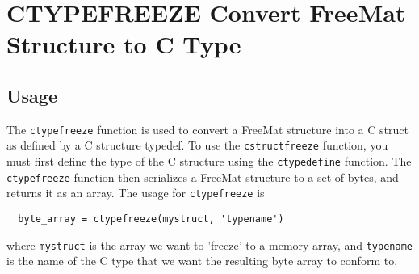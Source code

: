 \section{CTYPEFREEZE Convert FreeMat Structure to C Type}

\subsection{Usage}

The \verb|ctypefreeze| function is used to convert a FreeMat structure into
a C struct as defined by a C structure typedef.  To use the \verb|cstructfreeze|
function, you must first define the type of the C structure using the 
\verb|ctypedefine| function.  The \verb|ctypefreeze| function then serializes
a FreeMat structure to a set of bytes, and returns it as an array.  The
usage for \verb|ctypefreeze| is
\begin{verbatim}
  byte_array = ctypefreeze(mystruct, 'typename')
\end{verbatim}
where \verb|mystruct| is the array we want to 'freeze' to a memory array,
and \verb|typename| is the name of the C type that we want the resulting
byte array to conform to.
